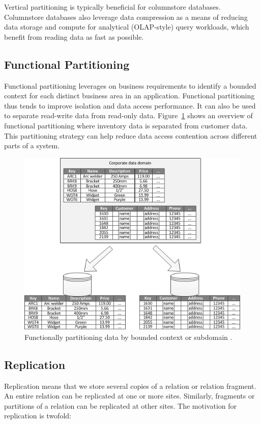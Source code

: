 Vertical partitioning is typically beneficial for columnstore databases. Columnstore databases also leverage data compression as a means of reducing data storage and compute for analytical (OLAP-style) query workloads, which benefit from reading data as fast as possible.

\subsection{Functional Partitioning}
Functional partitioning leverages on business requirements to identify a bounded context for each distinct business area in an application. Functional partitioning thus tends to improve isolation and data access performance. It can also be used to separate read-write data from read-only data. Figure~\ref{fig:functional-partitioning} shows an overview of functional partitioning where inventory data is separated from customer data. This partitioning strategy can help reduce data access contention across different parts of a system.

\begin{figure}[h]
  \centering
  \includegraphics{figures/functional-partitioning.png}
  \caption{Functionally partitioning data by bounded context or subdomain \cite{Datapart51:online}.}
  \label{fig:functional-partitioning}
\end{figure}

\subsection{Replication}
Replication means that we store several copies of a relation or relation fragment. An entire relation can be replicated at one or more sites. Similarly, fragments or partitions of a relation can be replicated at other sites. The motivation for replication is twofold:

